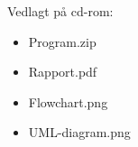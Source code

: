 \label{bil:cd}

Vedlagt på cd-rom:
\begin{itemize}
    \item Program.zip
    \item Rapport.pdf
    \item Flowchart.png
    \item UML-diagram.png
\end{itemize}